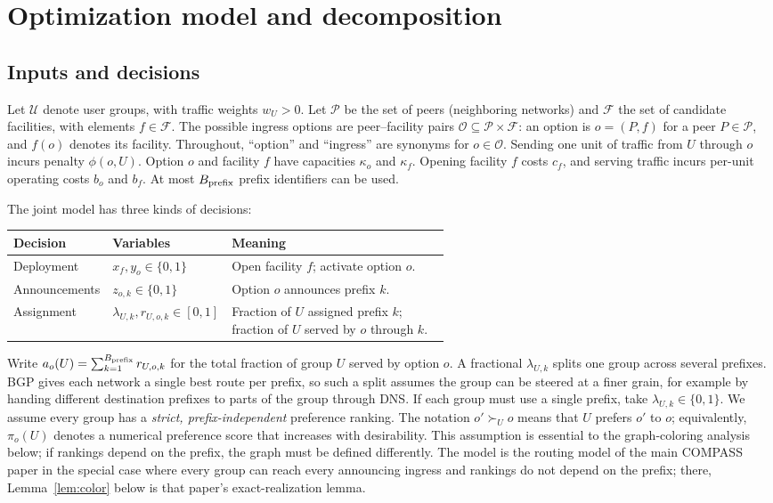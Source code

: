 \documentclass[10pt,a4paper]{article}
\newcommand{\U}{\mathcal U}
\newcommand{\F}{\mathcal F}
\newcommand{\Oset}{\mathcal O}
\begin{document}
\section{Optimization model and decomposition}
\label{sec:model}

\subsection{Inputs and decisions}

Let $\U$ denote user groups, with traffic weights $w_U>0$. Let $\mathcal P$ be the set of peers (neighboring networks) and $\F$ the set of candidate facilities, with elements $f\in\F$. The possible ingress options are peer--facility pairs $\Oset\subseteq\mathcal P\times\F$: an option is $o=(P,f)$ for a peer $P\in\mathcal P$, and $f(o)$ denotes its facility. Throughout, ``option'' and ``ingress'' are synonyms for $o\in\Oset$. Sending one unit of traffic from $U$ through $o$ incurs penalty $\phi(o,U)$. Option $o$ and facility $f$ have capacities $\kappa_o$ and $\kappa_f$. Opening facility $f$ costs $c_f$, and serving traffic incurs per-unit operating costs $b_o$ and $b_f$. At most $B_{\rm prefix}$ prefix identifiers can be used.

The joint model has three kinds of decisions:
\begin{center}
\small
\begin{tabular}{@{}llp{0.57\linewidth}@{}}
\toprule
\textbf{Decision} & \textbf{Variables} & \textbf{Meaning}\\
\midrule
Deployment & $x_f,y_o\in\{0,1\}$ & Open facility $f$; activate option $o$.\\
Announcements & $z_{o,k}\in\{0,1\}$ & Option $o$ announces prefix $k$.\\
Assignment & $\lambda_{U,k},r_{U,o,k}\in[0,1]$ & Fraction of $U$ assigned prefix $k$; fraction of $U$ served by $o$ through $k$.\\
\bottomrule
\end{tabular}
\end{center}
Write $a_o(U)=\sum_{k=1}^{B_{\rm prefix}} r_{U,o,k}$ for the total fraction of group $U$ served by option $o$. A fractional $\lambda_{U,k}$ splits one group across several prefixes. BGP gives each network a single best route per prefix, so such a split assumes the group can be steered at a finer grain, for example by handing different destination prefixes to parts of the group through DNS. If each group must use a single prefix, take $\lambda_{U,k}\in\{0,1\}$. We assume every group has a \emph{strict, prefix-independent} preference ranking. The notation $o'\succ_U o$ means that $U$ prefers $o'$ to $o$; equivalently, $\pi_o(U)$ denotes a numerical preference score that increases with desirability. This assumption is essential to the graph-coloring analysis below; if rankings depend on the prefix, the graph must be defined differently. The model is the routing model of the main COMPASS paper in the special case where every group can reach every announcing ingress and rankings do not depend on the prefix; there, Lemma~\ref{lem:color} below is that paper's exact-realization lemma.
\end{document}
